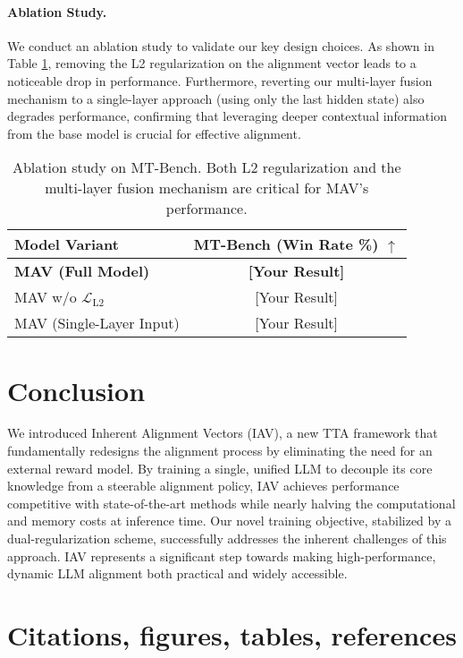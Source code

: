 \documentclass{article} %
\begin{document}
\paragraph{Ablation Study.}
We conduct an ablation study to validate our key design choices. As shown in Table \ref{tab:ablation}, removing the L2 regularization on the alignment vector leads to a noticeable drop in performance. Furthermore, reverting our multi-layer fusion mechanism to a single-layer approach (using only the last hidden state) also degrades performance, confirming that leveraging deeper contextual information from the base model is crucial for effective alignment.

\begin{table}[h!]
\centering
\caption{Ablation study on MT-Bench. Both L2 regularization and the multi-layer fusion mechanism are critical for MAV's performance.}
\label{tab:ablation}
\begin{tabular}{@{}lc@{}}
\toprule
\textbf{Model Variant} & \textbf{MT-Bench (Win Rate \%)} $\uparrow$ \\
\midrule
\textbf{MAV (Full Model)} & \textbf{[Your Result]} \\
MAV w/o $\mathcal{L}_{\text{L2}}$ & [Your Result] \\
MAV (Single-Layer Input) & [Your Result] \\
\bottomrule
\end{tabular}
\end{table}
\section{Conclusion}

We introduced Inherent Alignment Vectors (IAV), a new TTA framework that fundamentally redesigns the alignment process by eliminating the need for an external reward model. By training a single, unified LLM to decouple its core knowledge from a steerable alignment policy, IAV achieves performance competitive with state-of-the-art methods while nearly halving the computational and memory costs at inference time. Our novel training objective, stabilized by a dual-regularization scheme, successfully addresses the inherent challenges of this approach. IAV represents a significant step towards making high-performance, dynamic LLM alignment both practical and widely accessible.




\section{Citations, figures, tables, references}
\label{others}
\end{document}
